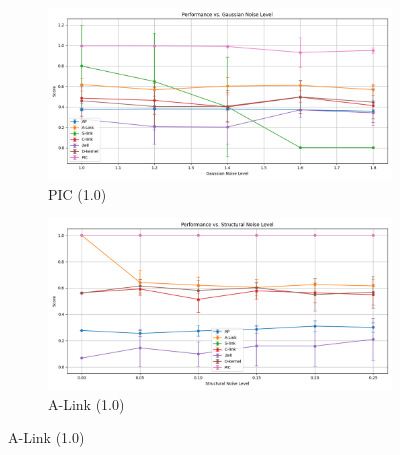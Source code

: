 \documentclass[
	10pt,
	parskip=half-,	
	paper=a4,
	english
	]{scrartcl}
\begin{document}
\begin{figure}[h!]
    \begin{subfigure}[b]{0.45\textwidth}
        \includegraphics[width=\textwidth]{../data/plots/results_gaussian_noise_moons.png}
        \caption{PIC (1.0)}
    \end{subfigure}
    \begin{subfigure}[b]{0.45\textwidth}
        \includegraphics[width=\textwidth]{../data/plots/results_structural_noise_moons.png}
        \caption{A-Link (1.0)}
    \end{subfigure}
    
    \vspace{0.3cm}
    

\end{figure}
\end{document}
